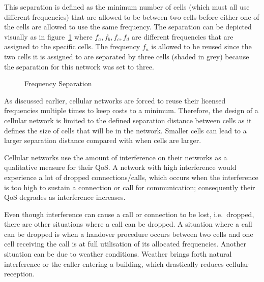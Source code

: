 This separation is defined as the minimum number of cells (which must all use different frequencies) that are allowed to be between two cells before either one of the cells are allowed to use the same frequency\cite{WirelessCommunications,InterferenceOrientatedFAP}. 
The separation can be depicted visually as in figure~\ref{fig:seperationgraph} where $f_a,f_b,f_c,f_d$ are different frequencies that are assigned to the specific cells. The frequency $f_a$ is allowed to be reused since the two cells it is assigned to are separated by three cells (shaded in grey) because the separation for this network was set to three.

\begin{figure}[H]
	\begin{centering}
	
	\caption{Frequency Separation}
	\label{fig:seperationgraph}
	\end{centering}
\end{figure}


As discussed earlier, cellular networks are forced to reuse their licensed frequencies multiple times to keep costs to a minimum. Therefore, the design of a cellular network is limited to the defined separation distance between cells as it defines the size of cells that will be in the network\cite{Eisenblatter,InterferenceOrientatedFAP}. Smaller cells can lead to a larger separation distance compared with when cells are larger\cite{WirelessCommunications,WirelessDigitalCommunications}.

Cellular networks use the amount of interference on their networks as a qualitative measure for their \gls{QoS}\cite{WirelessCommunications}. A network with high interference would experience a lot of dropped connections/calls, which occurs when the interference is too high to sustain a connection or call for communication; consequently their \gls{QoS} degrades as interference increases\cite{WirelessCommunications,WirelessDigitalCommunications}.

Even though interference can cause a call or connection to be lost, i.e.\ dropped, there are other situations where a call can be dropped\cite{GSMSysEngin}. A situation where a call can be dropped is when a handover procedure occurs between two cells and one cell receiving the call is at full utilisation of its allocated frequencies\cite{GSMSysEngin,WirelessDigitalCommunications}. Another situation can be due to weather conditions. Weather brings forth natural interference or the caller entering a building, which drastically reduces cellular reception\cite{WirelessDigitalCommunications}.


